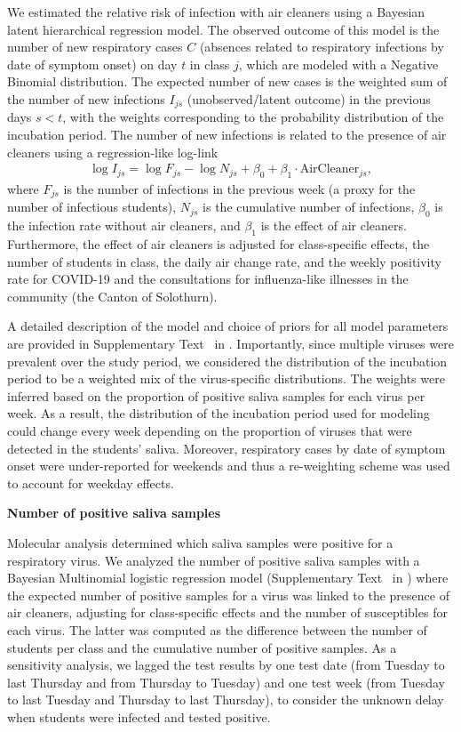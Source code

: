 \documentclass[fleqn,11pt]{wlscirep}
\begin{document}
\noindent We estimated the relative risk of infection with air cleaners using a Bayesian latent hierarchical regression model. The observed outcome of this model is the number of new respiratory cases $C$ (absences related to respiratory infections by date of symptom onset) on day $t$ in class $j$, which are modeled with a Negative Binomial distribution. The expected number of new cases is the weighted sum of the number of new infections $I_{js}$ (unobserved/latent outcome) in the previous days $s<t$, with the weights corresponding to the probability distribution of the incubation period. The number of new infections is related to the presence of air cleaners using a regression-like log-link
\begin{align}
    \log I_{js} = \log F_{js} - \log N_{js} + \beta_0 + \beta_1 \cdot \text{AirCleaner}_{js},
\end{align}
where $F_{js}$ is the number of infections in the previous week (a proxy for the number of infectious students), $N_{js}$ is the cumulative number of infections, $\beta_0$ is the infection rate without air cleaners, and $\beta_1$ is the effect of air cleaners. Furthermore, the effect of air cleaners is adjusted for class-specific effects, the number of students in class, the daily air change rate, and the weekly positivity rate for COVID-19 and the consultations for influenza-like illnesses in the community (\ie the Canton of Solothurn).

A detailed description of the model and choice of priors for all model parameters are provided in Supplementary Text~ in \supp. Importantly, since multiple viruses were prevalent over the study period, we considered the distribution of the incubation period to be a weighted mix of the virus-specific distributions. The weights were inferred based on the proportion of positive saliva samples for each virus per week. As a result, the distribution of the incubation period used for modeling could change every week depending on the proportion of viruses that were detected in the students' saliva. Moreover, respiratory cases by date of symptom onset were under-reported for weekends and thus a re-weighting scheme was used to account for weekday effects. \medskip

\noindent\textbf{Number of positive saliva samples} \smallskip

\noindent Molecular analysis determined which saliva samples were positive for a respiratory virus. We analyzed the number of positive saliva samples with a Bayesian Multinomial logistic regression model (Supplementary Text~ in \supp) where the expected number of positive samples for a virus was linked to the presence of air cleaners, adjusting for class-specific effects and the number of susceptibles for each virus. The latter was computed as the difference between the number of students per class and the cumulative number of positive samples. As a sensitivity analysis, we lagged the test results by one test date (\ie from Tuesday to last Thursday and from Thursday to Tuesday) and one test week (\ie from Tuesday to last Tuesday and Thursday to last Thursday), to consider the unknown delay when students were infected and tested positive. \medskip
\end{document}
